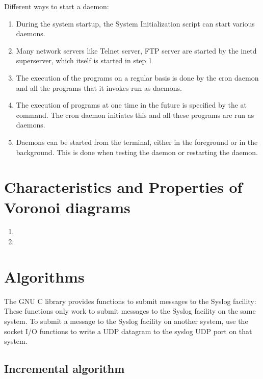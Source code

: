 \documentclass[12pt]{article} %
\begin{document}
Different ways to start a daemon:
\begin{enumerate}
\item{During the system startup, the System Initialization script can start various daemons.}
\item{Many network servers like Telnet server, FTP server are started by the inetd superserver, which itself is started in step 1}
\item{The execution of the programs on a regular basis is done by the cron daemon and all the programs that it invokes run as daemons.}
\item{The execution of programs at one time in the future is specified by the at command. The cron daemon initiates this and all these programs are run as daemons.}
	\item{Daemons can be started from the terminal, either in the foreground or in the background. This is done when testing the daemon or restarting the daemon.}
\end{enumerate}
\section{Characteristics and Properties of Voronoi diagrams}

\begin{enumerate}
\item{}
\item{}
\end{enumerate}





\section{Algorithms}
The GNU C library provides functions to submit messages to the Syslog facility:
These functions only work to submit messages to the Syslog facility on the same system. To submit a message to the Syslog facility on another system, use the socket I/O functions to write a UDP datagram to the syslog UDP port on that system.
%

\subsection{Incremental algorithm}
\end{document}

